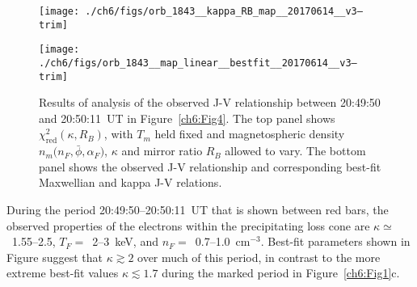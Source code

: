 
  \begin{figure}
    \centering

    \noindent\texttt{[image: ./ch6/figs/orb\_1843\_\_kappa\_RB\_map\_\_20170614\_\_v3--trim]}

    \vspace{1cm}

    \noindent\texttt{[image: ./ch6/figs/orb\_1843\_\_map\_linear\_\_bestfit\_\_20170614\_\_v3--trim]}




    \caption[Orbit 1843: Reduced chi-squared values for observed J-V
    relationship and corresponding best-fit J-V curves.]{Results of analysis of
      the observed J-V relationship between 20:49:50 and 20:50:11~UT in
      Figure~\ref{ch6:Fig4}. The top panel shows
      $\chi^2_{\mathrm{red}} ( \kappa, R_B)$, with $T_m$ held fixed and
      magnetospheric density $n_m \big ( n_F, \bar{\phi}, \alpha_F \big )$,
      $\kappa$ and mirror ratio $R_B$ allowed to vary. The bottom panel shows
      the observed J-V relationship and corresponding best-fit Maxwellian and
      kappa J-V relations.}
    \label{ch6:Fig6}
  \end{figure}

  
  During the period 20:49:50--20:50:11~UT that is shown between red bars, the
  observed properties of the electrons within the precipitating loss cone are
  $\kappa \simeq $~1.55--2.5, $T_F =$~2--3~keV, and $n_F =$~0.7--1.0~cm$^{-3}$.
  Best-fit parameters shown in Figure suggest that $\kappa \gtrsim 2$ over much of this period,
  in contrast to the more extreme best-fit values $\kappa \lesssim 1.7$ during
  the marked period in Figure~\ref{ch6:Fig1}c.

